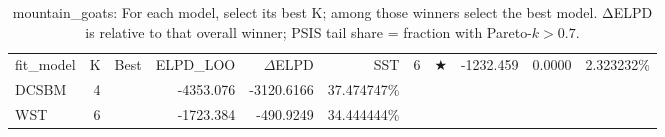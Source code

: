 \begin{table}[!h]
\centering
\caption{mountain_goats: For each model, select its best K; among those winners select the best model. ΔELPD is relative to that overall winner; PSIS tail share = fraction with Pareto-\(k>0.7\).\\\label{tab:app-mountain_goats-bestK-per-model}}
\centering
\begin{tabular}[t]{lrlrrr}
\toprule
fit_model & K & Best & ELPD\_LOO & $\Delta$ELPD & %
\midrule
SST & 6 & $\bigstar$ & -1232.459 & 0.0000 & 2.323232\%\\
DCSBM & 4 &  & -4353.076 & -3120.6166 & 37.474747\%\\
WST & 6 &  & -1723.384 & -490.9249 & 34.444444\%\\
\bottomrule
\end{tabular}
\end{table}
